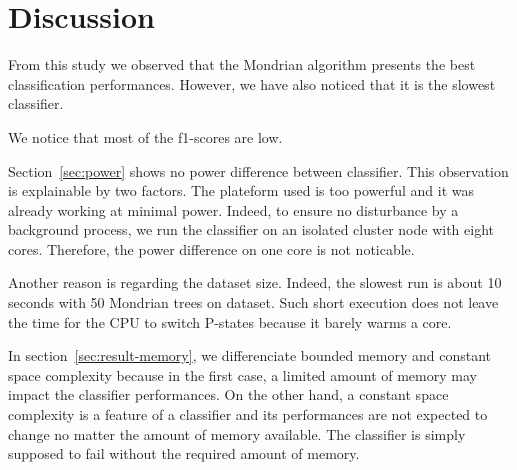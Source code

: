 \section{Discussion}
From this study we observed that the Mondrian algorithm presents the best classification performances.
However, we have also noticed that it is the slowest classifier.


We notice that most of the f1-scores are low.


Section~\ref{sec:power} shows no power difference between classifier. This
observation is explainable by two factors. The plateform used is too powerful
and it was already working at minimal power. Indeed, to ensure no disturbance
by a background process, we run the classifier on an isolated cluster node with
eight cores. Therefore, the power difference on one core is not noticable.

Another reason is regarding the dataset size. Indeed, the slowest run is about
10 seconds with 50 Mondrian trees on \recofitdataset dataset.  Such short
execution does not leave the time for the CPU to switch P-states because it
barely warms a core.

In section~\ref{sec:result-memory}, we differenciate bounded memory and
constant space complexity because in the first case, a limited amount of memory
may impact the classifier performances. On the other hand, a constant space
complexity is a feature of a classifier and its performances are not expected
to change no  matter the amount of memory available. The classifier is simply
supposed to fail without the required amount of memory.







